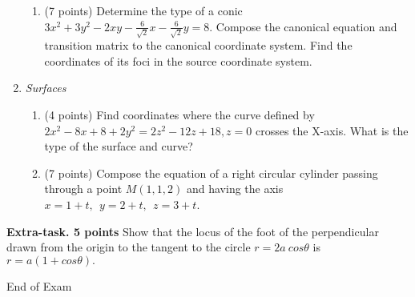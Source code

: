 \documentclass[]{exam}
\begin{document}
\begin{enumerate}
\begin{enumerate}
\item (7 points)
Determine the type of a conic $3x^2+3y^2-2xy-\frac{6}{\sqrt{2}}x-\frac{6}{\sqrt{2}}y=8$. Compose the canonical equation and transition matrix to the canonical coordinate system. Find the coordinates of its foci in the source coordinate system.
\end{enumerate}

\item  \textit{Surfaces}
\begin{enumerate}
\item (4 points) 
Find coordinates where the curve defined by
$2x^2 - 8x +8 + 2y^2=2z^2 -12z +18, z=0$ crosses the X-axis. What is the type of the surface and curve?

\item (7 points) 
 Compose the equation of a right circular cylinder passing through a point $M(1,1,2)$ and having the axis $x=1+t,~~y=2+t,~~z=3+t$.
\end{enumerate}
\end{enumerate}


\textbf{Extra-task. 5 points}
Show that the locus of the foot of the perpendicular drawn from the origin to the tangent to the circle $r= 2a \  cos \theta$ is $r = a(1 + cos \theta).$

\begin{center}
End of Exam
\end{center}
\end{document}
